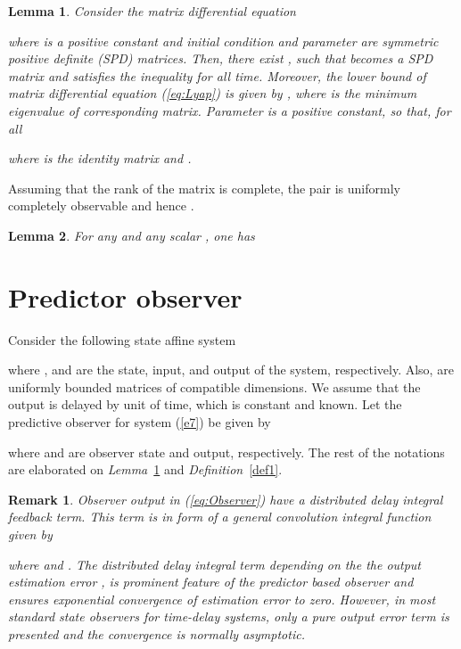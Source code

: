 \documentclass[12pt,draftcls,onecolumn]{IEEEtran}
\newtheorem{lem}{Lemma}
\newtheorem{rem}{Remark}
\newcommand{\carrew} {\hfill }
\begin{document}
\begin{lem} \label{lem1} \cite{c18,c19} \label{def3}  Consider the matrix differential equation

where  is a positive constant and initial condition  and parameter  are symmetric positive definite (SPD) matrices. Then, there exist , such that  becomes a SPD matrix and satisfies the inequality  for all time. Moreover, the lower bound of matrix differential equation (\ref{eq:Lyap}) is given by  \cite{c18}, where  is the minimum eigenvalue of corresponding matrix. Parameter  is a positive constant, so that, for all 

where  is the  identity matrix and . \carrew
\end{lem}
Assuming that the rank of the matrix  is complete, the pair  is uniformly completely observable and hence .


\begin{lem} \label{young} For any   and any scalar  , one has
 \carrew
\end{lem}

\section{Predictor observer }
Consider the following state affine system

where ,  and  are the state, input, and output of the system, respectively. Also,  are uniformly bounded matrices of compatible dimensions. We assume that the output is delayed by  unit of time, which is constant and known. Let the predictive observer for system (\ref{e7}) be given by

where  and  are observer state and output, respectively. The rest of the notations are elaborated on \textit{Lemma}~\ref{lem1} and \textit{Definition}~\ref{def1}.



\begin{rem} \label{remphi} Observer output in (\ref{eq:Observer}) have a distributed delay integral feedback term. This term is in form of a general convolution integral function given by

where  and .
The distributed delay integral term depending on the the output estimation error , is prominent feature of the predictor based observer and ensures exponential convergence of estimation error to zero. 
However, in most standard state observers for time-delay systems, only a pure output error term is presented and the convergence is normally asymptotic. \carrew
\end{rem}
\end{document}
